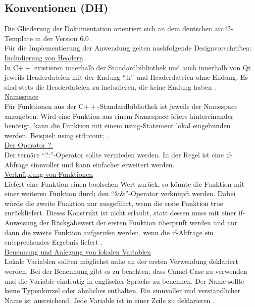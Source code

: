 \subsection{Konventionen (DH)}
\label{KONVENTIONEN}
Die Gliederung der Dokumentation orientiert sich an dem deutschen arc42-Template in der Version 6.0 \cite{arc42}. \\
Für die Implementierung der Anwendung gelten nachfolgende Designvorschriften:\bigskip \\
\underline{Includierung von Headern}\\
In C$++$ existieren innerhalb der Standardbibliothek und auch innerhalb von Qt jeweils Headerdateien mit der Endung "`.h"' und Headerdateien ohne Endung. Es sind stets die Headerdateien zu includieren, die keine Endung haben \cite[vgl.][]{C_Foundation}.\bigskip \\
\underline{Namespace}\\
Für Funktionen aus der C$++$-Standardbibliothek ist jeweils der Namespace anzugeben. Wird eine Funktion aus einem Namespace öfters hintereinander benötigt, kann die Funktion mit einem using-Statement lokal eingebunden werden. Beispiel: using std::cout; \cite[vgl.][]{C_Foundation}.\bigskip \\
\underline{Der Operator ?:}\\
Der ternäre "`?:"'-Operator sollte vermieden werden. In der Regel ist eine if-Abfrage sinnvoller und kann einfacher erweitert werden.\bigskip \\
\underline{Verknüpfung von Funktionen}\\
Liefert eine Funktion einen boolschen Wert zurück, so könnte die Funktion mit einer weiteren Funktion durch den "`\&\&"'-Operator verknüpft werden. Dabei würde die zweite Funktion nur ausgeführt, wenn die erste Funktion true zurückliefert. Dieses Konstrukt ist nicht erlaubt, statt dessen muss mit einer if-Anweisung der Rückgabewert der ersten Funktion überprüft werden und nur dann die zweite Funktion aufgerufen werden, wenn die if-Abfrage ein entsprechendes Ergebnis liefert \cite[vgl.][]{C_Foundation}.\bigskip \\
\underline{Benennung und Anlegung von lokalen Variablen}\\
Lokale Variablen sollten möglichst nahe an der ersten Verwendung deklariert werden. Bei der Benennung gibt es zu beachten, dass Camel-Case zu verwenden und die Variable eindeutig in englischer Sprache zu benennen. Der Name sollte keine Typenkürzel oder ähnliches enthalten. Ein sinnvoller und verständlicher Name ist ausreichend. Jede Variable ist in einer Zeile zu deklarieren \cite[vgl.][]{C_Foundation}.\bigskip \\
